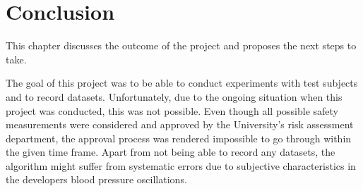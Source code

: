 \chapter{Conclusion} %

This chapter discusses the outcome of the project and proposes the next steps to take.




The goal of this project was to be able to conduct experiments with test subjects and to record datasets. Unfortunately, due to the ongoing situation when this project was conducted, this was not possible. Even though all possible safety measurements were considered and approved by the University's risk assessment department, the approval process was rendered impossible to go through within the given time frame. Apart from not being able to record any datasets, the algorithm might suffer from systematic errors due to subjective characteristics in the developers blood pressure oscillations. 










